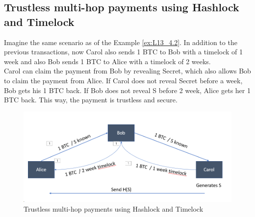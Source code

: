 \subsection{Trustless multi-hop payments using Hashlock and Timelock}
Imagine the same scenario as of the Example \ref{ex:L13_4.2}. In addition to the previous transactions, now Carol also sends 1 BTC to Bob with a timelock of 1 week and also Bob sends 1 BTC to Alice with a timelock of 2 weeks. \\
Carol can claim the payment from Bob by revealing Secret, which also allows Bob to claim the payment from Alice. If Carol does not reveal Secret before a week, Bob gets his 1 BTC back. If Bob does not reveal S before 2 week, Alice gets her 1 BTC back. This way, the payment is trustless and secure.
\begin{figure}[h!]
	\centering
	\includegraphics[width=0.6\linewidth]{Fig/13/F7}
	\caption{Trustless multi-hop payments using Hashlock and Timelock}
	\label{fig:L13_f7}
\end{figure}

